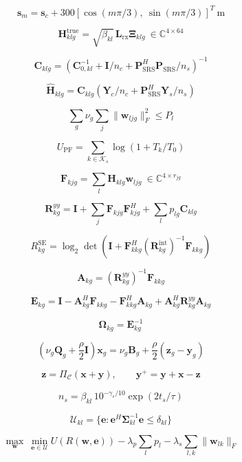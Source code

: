 \[\mathbf{s}_m=\mathbf{s}_c+300[\cos(m\pi/3),\ \sin(m\pi/3)]^T\ \mathrm{m}\]

\[\mathbf{H}^{\mathrm{true}}_{klg}=\sqrt{\beta_{kl}}\,\mathbf{L}_{\mathrm{rx}}\boldsymbol{\Xi}_{klg}\ \in\mathbb{C}^{4\times64}\]

\[\mathbf{C}_{klg}=\left(\mathbf{C}_{0,kl}^{-1}+\mathbf{I}/n_c+\mathbf{P}_{\mathrm{SRS}}^H\mathbf{P}_{\mathrm{SRS}}/n_s\right)^{-1}\]

\[\widehat{\mathbf{H}}_{klg}=\mathbf{C}_{klg}\left(\mathbf{Y}_{c}/n_c+\mathbf{P}_{\mathrm{SRS}}^H\mathbf{Y}_{s}/n_s\right)\]

\[\sum_g\nu_g\sum_j\|\mathbf{w}_{ljg}\|_F^2\leq P_l\]

\[U_{\mathrm{PF}}=\sum_{k\in\mathcal{K}_s}\log(1+T_k/T_0)\]

\[\mathbf{F}_{kjg}=\sum_l\mathbf{H}_{klg}\mathbf{w}_{ljg}\ \in\mathbb{C}^{4\times r_{jg}}\]

\[\mathbf{R}^{yy}_{kg}=\mathbf{I}+\sum_j\mathbf{F}_{kjg}\mathbf{F}_{kjg}^H+\sum_l p_{lg}\mathbf{C}_{klg}\]

\[R_{kg}^{\mathrm{SE}}=\log_2\det\!\left(\mathbf{I}+\mathbf{F}_{kkg}^H(\mathbf{R}_{kg}^{\mathrm{int}})^{-1}\mathbf{F}_{kkg}\right)\]

\[\mathbf{A}_{kg}=\left(\mathbf{R}^{yy}_{kg}\right)^{-1}\mathbf{F}_{kkg}\]

\[\mathbf{E}_{kg}=\mathbf{I}-\mathbf{A}_{kg}^H\mathbf{F}_{kkg}-\mathbf{F}_{kkg}^H\mathbf{A}_{kg}+\mathbf{A}_{kg}^H\mathbf{R}^{yy}_{kg}\mathbf{A}_{kg}\]

\[\boldsymbol{\Omega}_{kg}=\mathbf{E}_{kg}^{-1}\]

\[\left(\nu_g\mathbf{Q}_g+\frac{\rho}{2}\mathbf{I}\right)\mathbf{x}_g=\nu_g\mathbf{B}_g+\frac{\rho}{2}(\mathbf{z}_g-\mathbf{y}_g)\]

\[\mathbf{z}=\Pi_{\mathcal{C}}(\mathbf{x}+\mathbf{y}),\qquad\mathbf{y}^{+}=\mathbf{y}+\mathbf{x}-\mathbf{z}\]

\[n_s=\beta_{kl}\,10^{-\gamma_s/10}\exp(2t_s/\tau)\]

\[\mathcal{U}_{kl}=\{\mathbf{e}:\mathbf{e}^H\boldsymbol{\Sigma}_{kl}^{-1}\mathbf{e}\leq\delta_{kl}\}\]

\[\max_{\mathbf{w}}\ \min_{\mathbf{e}\in\mathcal{U}}U(R(\mathbf{w},\mathbf{e}))-\lambda_p\sum_l p_l-\lambda_s\sum_{l,k}\|\mathbf{w}_{lk}\|_F\]
